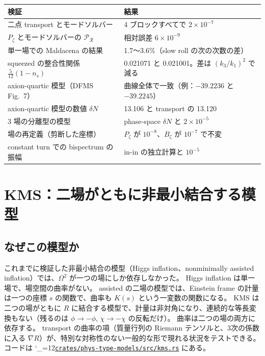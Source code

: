 \documentclass[a4paper,11pt]{ltjsarticle}
\newcommand{\repourl}{https://github.com/inuverse44/phys-type-dev}
\newcommand{\reporev}{b1fea87}
\newcommand{\repo}{\begingroup\catcode`\_=12\relax\repoaux}
\newcommand{\repoaux}[1]{\href{\repourl/blob/\reporev/#1}{\nolinkurl{#1}}\endgroup}
\begin{document}
\begin{center}
\small
\begin{tabular}{p{6.2cm}p{7.4cm}}
\toprule
検証 & 結果 \\
\midrule
二点 transport とモードソルバー & 4 ブロックすべてで $2\times10^{-7}$ \\
$P_\zeta$ とモードソルバーの $\mathcal P_{\mathcal R}$ & 相対誤差 $6\times10^{-9}$ \\
単一場での Maldacena の結果 & 1.7〜3.6\%（slow roll の次の次数の差） \\
squeezed の整合性関係 $\tfrac5{12}(1-n_s)$ & 0.021071 と 0.021001。差は $(k_3/k_1)^2$ で減る \\
axion-quartic 模型\cite{Elliston2012}（DFMS Fig.~7\cite{DFMS2016}） & 曲線全体で一致（例：$-39.2236$ と $-39.2245$） \\
axion-quartic 模型の数値 $\delta N$ & 13.106 と transport の 13.120 \\
3 場の分離型の模型\cite{BattefeldEasther2007} & phase-space $\delta N$ と $2\times10^{-5}$ \\
場の再定義（剪断した座標） & $P_\zeta$ が $10^{-8}$、$B_\zeta$ が $10^{-7}$ で不変 \\
constant turn での bispectrum の振幅\cite{HMPS2026b} & in-in の独立計算と $10^{-5}$ \\
\bottomrule
\end{tabular}
\end{center}

\section{KMS：二場がともに非最小結合する模型}
\label{sec:kms}

\subsection{なぜこの模型か}

これまでに検証した非最小結合の模型（Higgs inflation\cite{BezrukovShaposhnikov2008}、nonminimally assisted inflation\cite{HKKPT2023}）では、$\Omega^2$ が一つの場にしか依存しなかった。
Higgs inflation は単一場で、場空間の曲率がない。
assisted の二場の模型では、Einstein frame の計量は一つの座標 $s$ の関数で、曲率も $K(s)$ という一変数の関数になる。
KMS は二つの場がともに $R$ に結合する模型で、計量は非対角になり、連続的な等長変換もない（残るのは $\phi\to-\phi$, $\chi\to-\chi$ の反転だけ）。
曲率は二つの場の両方に依存する。
transport の曲率の項（質量行列の Riemann テンソルと、3次の係数に入る $\nabla R$）が、特別な対称性のない一般的な形で現れる状況をテストできる。
コードは \repo{crates/phys-type-models/src/kms.rs} にある。
\end{document}
